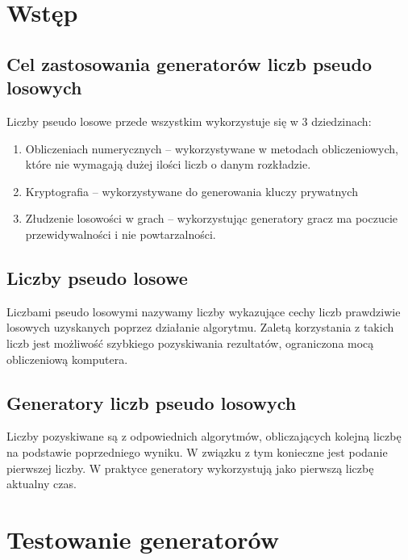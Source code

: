 \documentclass[11pt]{aghdpl}
\author{Żaneta Błaszczuk, Rafał Kozik, Filip Kubicz, Jakub Nowak, Jakub Porębski}
\date{2014}
\begin{document}
\titlepages
\section{Wstęp}
\subsection{Cel zastosowania generatorów liczb pseudo losowych}
Liczby pseudo losowe przede wszystkim wykorzystuje się w 3 dziedzinach:
\begin{enumerate}
\item Obliczeniach numerycznych – wykorzystywane w metodach obliczeniowych, które nie wymagają dużej ilości liczb o danym rozkładzie.
\item Kryptografia – wykorzystywane do generowania kluczy prywatnych
\item Złudzenie losowości w grach – wykorzystując generatory gracz ma poczucie przewidywalności i nie powtarzalności.  
\end{enumerate}
\subsection{Liczby pseudo losowe}
Liczbami pseudo losowymi nazywamy liczby wykazujące cechy liczb prawdziwie losowych uzyskanych poprzez działanie algorytmu. Zaletą korzystania z takich liczb jest możliwość szybkiego pozyskiwania rezultatów, ograniczona mocą obliczeniową komputera.
\subsection{Generatory liczb pseudo losowych}
Liczby pozyskiwane są z odpowiednich algorytmów, obliczających kolejną liczbę na podstawie poprzedniego wyniku. W związku z tym konieczne jest podanie pierwszej liczby. W praktyce generatory wykorzystują jako pierwszą liczbę aktualny czas. 
\section{Testowanie generatorów}
\end{document}
